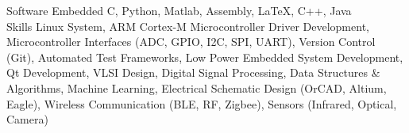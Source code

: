 

\begin{cvskills}


\cvskill
    {Software} %
    {Embedded C, Python, Matlab, Assembly, 
    \LaTeX, C++, Java}
\\
\cvskill
    {Skills} %
    {Linux System, ARM Cortex-M Microcontroller Driver Development, 
    Microcontroller Interfaces (ADC, GPIO, I2C, SPI, UART), Version Control (Git), 
    Automated Test Frameworks, Low Power Embedded System Development, Qt Development,
    VLSI Design, Digital Signal Processing, Data Structures \& Algorithms,
    Machine Learning,
    Electrical Schematic Design (OrCAD, Altium, Eagle),
    Wireless Communication (BLE, RF, Zigbee),
    Sensors (Infrared, Optical, Camera) }
\end{cvskills}
